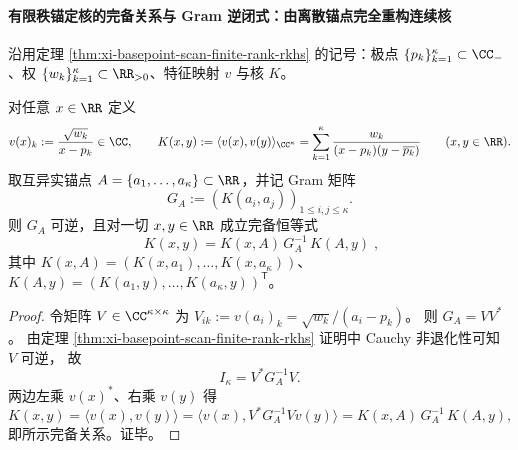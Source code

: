 
\paragraph{有限秩锚定核的完备关系与 Gram 逆闭式：由离散锚点完全重构连续核}
沿用定理 \ref{thm:xi-basepoint-scan-finite-rank-rkhs} 的记号：极点 \(\{p_k\}_{k=1}^{\kappa}\subset\CC_{-}\)、权 \(\{w_k\}_{k=1}^{\kappa}\subset\RR_{>0}\)、特征映射 \(v\) 与核 \(K\)。

\begin{proposition}\label{prop:xi-basepoint-scan-kernel-completeness-full-rank}
对任意 \(x\in\RR\) 定义
\[
v(x)_k:=\frac{\sqrt{w_k}}{x-p_k}\in\CC,\qquad
K(x,y):=\langle v(x),v(y)\rangle_{\CC^\kappa}
=\sum_{k=1}^{\kappa}\frac{w_k}{(x-p_k)(y-\overline{p_k})}\qquad(x,y\in\RR).
\]
取互异实锚点 \(A=\{a_1,\dots,a_\kappa\}\subset\RR\)，并记 Gram 矩阵
\[
G_A:=(K(a_i,a_j))_{1\le i,j\le \kappa}.
\]
则 \(G_A\) 可逆，且对一切 \(x,y\in\RR\) 成立完备恒等式
\[
\boxed{\;
K(x,y)=K(x,A)\,G_A^{-1}\,K(A,y)\; },
\]
其中
\(
K(x,A)=(K(x,a_1),\dots,K(x,a_\kappa))
\)、
\(
K(A,y)=(K(a_1,y),\dots,K(a_\kappa,y))^{\mathsf T}
\)。
\end{proposition}
\begin{proof}
令矩阵 \(V\in\CC^{\kappa\times\kappa}\) 为
\(
V_{ik}:=v(a_i)_k=\sqrt{w_k}/(a_i-p_k)
\)。
则 \(G_A=VV^\ast\)。
由定理 \ref{thm:xi-basepoint-scan-finite-rank-rkhs} 证明中 Cauchy 非退化性可知 \(V\) 可逆，
故
\[
I_\kappa=V^\ast G_A^{-1}V.
\]
两边左乘 \(v(x)^\ast\)、右乘 \(v(y)\) 得
\[
K(x,y)
=\langle v(x),v(y)\rangle
=\langle v(x),V^\ast G_A^{-1}Vv(y)\rangle
=K(x,A)\,G_A^{-1}\,K(A,y),
\]
即所示完备关系。证毕。
\end{proof}

